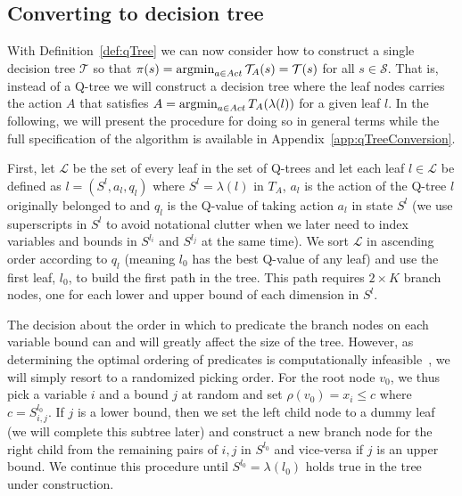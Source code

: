 \subsection{Converting to decision tree}%
\label{subsec:convertQTtoDT}

With Definition~\ref{def:qTree} we can now consider how to construct a single
decision tree $\mathcal{T}$ so that $\pi(s) = \operatorname*{argmin}_{a \in Act}
\mathcal{T}_A(s) = \mathcal{T}(s)$ for all $s \in \mathcal{S}$. That is, instead
of a Q-tree we will construct a decision tree where the leaf nodes carries the
action $A$ that satisfies $A = \operatorname*{argmin}_{a \in Act} T_A(\lambda(l))$ for
a given leaf $l$. In the following, we will present the procedure for doing so
in general terms while the full specification of the algorithm is available in
Appendix~\ref{app:qTreeConversion}.

First, let $\mathcal{L}$ be the set of every leaf in the set of Q-trees and let
each leaf $l \in \mathcal{L}$ be defined as $l = (S^{l}, a_l, q_l)$ where $S^{l} =
\lambda(l)$ in $T_A$, $a_l$ is the action of the Q-tree $l$ originally belonged to
and $q_l$ is the Q-value of taking action $a_l$ in state $S^{l }$ (we use
superscripts in $S^l$ to avoid notational clutter when we later need to index
variables and bounds in $S^{l_i}$ and $S^{l_j}$ at the same time). We sort
$\mathcal{L}$ in ascending order according to $q_l$ (meaning $l_0$ has the best
Q-value of any leaf) and use the first leaf, $l_0$, to build the first path in
the tree. This path requires $2 \times K$ branch nodes, one for each lower and
upper bound of each dimension in  $S^{l}$.

The decision about the order in which to predicate the branch nodes on each
variable bound can and will greatly affect the size of the tree. However, as
determining the optimal ordering of predicates is computationally
infeasible~\cite{HYAFIL197615}, we will simply resort to a randomized picking
order.  For the root node $v_0$, we thus pick a variable $i$ and a bound $j$ at
random and set $\rho(v_0) = x_i \le c$ where $c = S^{l_0}_{i,j}$. If $j$ is a
lower bound, then we set the left child node to a dummy leaf (we will complete
this subtree later) and construct a new branch node for the right child from the
remaining pairs of $i, j$ in $S^{l_0}$ and vice-versa if $j$ is an upper bound.
We continue this procedure until $S^{l_0} = \lambda(l_0)$ holds true in the tree
under construction.

